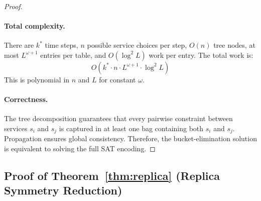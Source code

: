 \documentclass[10pt,twocolumn]{article}
\begin{document}
\begin{proof}
\paragraph{Total complexity.} There are $k^{*}$ time steps, $n$
possible service choices per step, $O(n)$ tree nodes, at most
$L^{\omega+1}$ entries per table, and $O(\log^2 L)$ work per
entry. The total work is:
\[
  O(k^{*} \cdot n \cdot L^{\omega+1} \cdot \log^2 L)
\]
This is polynomial in $n$ and $L$ for constant $\omega$.

\paragraph{Correctness.} The tree decomposition guarantees that
every pairwise constraint between services $s_i$ and $s_j$ is
captured in at least one bag containing both $s_i$ and $s_j$.
Propagation ensures global consistency. Therefore, the
bucket-elimination solution is equivalent to solving the full
SAT encoding.
\end{proof}

\subsection{Proof of Theorem~\ref{thm:replica} (Replica Symmetry Reduction)}
\end{document}
